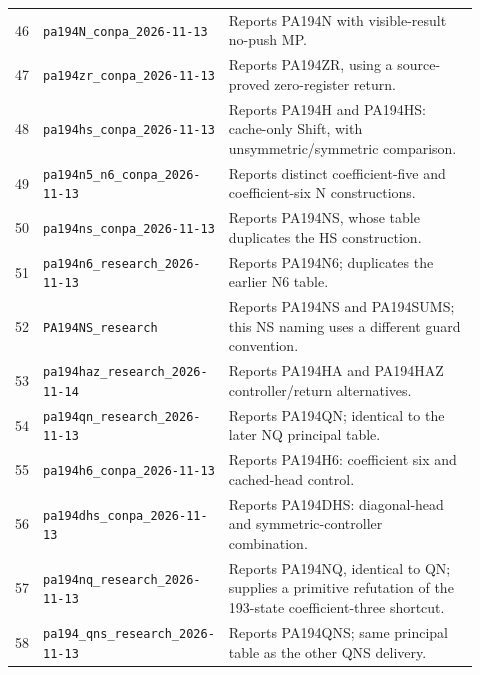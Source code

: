{\begin{longtable}{@{}r >{\raggedright\arraybackslash}p{0.36\linewidth} >{\raggedright\arraybackslash}p{0.56\linewidth}@{}}
46 & \texttt{pa194N\_\allowbreak{}conpa\_\allowbreak{}2026-\allowbreak{}11-\allowbreak{}13} & Reports PA194N with visible-result no-push MP.\\[3pt]
47 & \texttt{pa194zr\_\allowbreak{}conpa\_\allowbreak{}2026-\allowbreak{}11-\allowbreak{}13} & Reports PA194ZR, using a source-proved zero-register return.\\[3pt]
48 & \texttt{pa194hs\_\allowbreak{}conpa\_\allowbreak{}2026-\allowbreak{}11-\allowbreak{}13} & Reports PA194H and PA194HS: cache-only Shift, with unsymmetric/symmetric comparison.\\[3pt]
49 & \texttt{pa194n5\_\allowbreak{}n6\_\allowbreak{}conpa\_\allowbreak{}2026-\allowbreak{}11-\allowbreak{}13} & Reports distinct coefficient-five and coefficient-six N constructions.\\[3pt]
50 & \texttt{pa194ns\_\allowbreak{}conpa\_\allowbreak{}2026-\allowbreak{}11-\allowbreak{}13} & Reports PA194NS, whose table duplicates the HS construction.\\[3pt]
51 & \texttt{pa194n6\_\allowbreak{}research\_\allowbreak{}2026-\allowbreak{}11-\allowbreak{}13} & Reports PA194N6; duplicates the earlier N6 table.\\[3pt]
52 & \texttt{PA194NS\_\allowbreak{}research} & Reports PA194NS and PA194SUMS; this NS naming uses a different guard convention.\\[3pt]
53 & \texttt{pa194haz\_\allowbreak{}research\_\allowbreak{}2026-\allowbreak{}11-\allowbreak{}14} & Reports PA194HA and PA194HAZ controller/return alternatives.\\[3pt]
54 & \texttt{pa194qn\_\allowbreak{}research\_\allowbreak{}2026-\allowbreak{}11-\allowbreak{}13} & Reports PA194QN; identical to the later NQ principal table.\\[3pt]
55 & \texttt{pa194h6\_\allowbreak{}conpa\_\allowbreak{}2026-\allowbreak{}11-\allowbreak{}13} & Reports PA194H6: coefficient six and cached-head control.\\[3pt]
56 & \texttt{pa194dhs\_\allowbreak{}conpa\_\allowbreak{}2026-\allowbreak{}11-\allowbreak{}13} & Reports PA194DHS: diagonal-head and symmetric-controller combination.\\[3pt]
57 & \texttt{pa194nq\_\allowbreak{}research\_\allowbreak{}2026-\allowbreak{}11-\allowbreak{}13} & Reports PA194NQ, identical to QN; supplies a primitive refutation of the 193-state coefficient-three shortcut.\\[3pt]
58 & \texttt{pa194\_\allowbreak{}qns\_\allowbreak{}research\_\allowbreak{}2026-\allowbreak{}11-\allowbreak{}13} & Reports PA194QNS; same principal table as the other QNS delivery.\\[3pt]

\end{longtable}}
